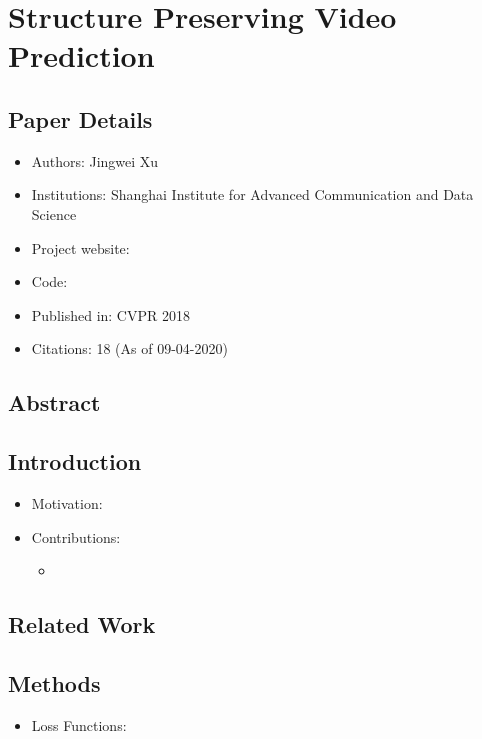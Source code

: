 \documentclass{article}
\begin{document}
    \section{Structure Preserving Video Prediction}\label{sec:Structure_Preserving_Video_Prediction}
    \subsection*{Paper Details}
    \begin{itemize}
        \item Authors: Jingwei Xu
        \item Institutions: Shanghai Institute for Advanced Communication and Data Science
        \item Project website:
        \item Code:
        \item Published in: CVPR 2018
        \item Citations: 18 (As of 09-04-2020)
    \end{itemize}

    \subsection*{Abstract}

    \subsection{Introduction}\label{subsec:Structure_Preserving_Video_Prediction:introduction}
    \begin{itemize}
        \item Motivation:
        \item Contributions:
        \begin{itemize}
            \item
        \end{itemize}
    \end{itemize}

    \subsection{Related Work}\label{subsec:Structure_Preserving_Video_Prediction:related-work}

    \subsection{Methods}\label{subsec:Structure_Preserving_Video_Prediction:methods}
    \begin{itemize}
        \item Loss Functions:
    \end{itemize}
\end{document}

